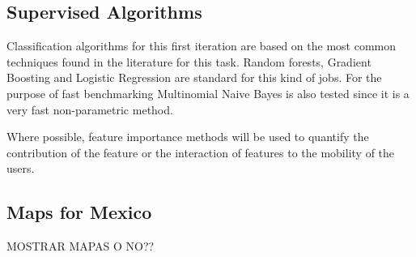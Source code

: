 \subsection{Supervised Algorithms}

Classification algorithms for this first iteration are based on the most common techniques found in the literature for this task. Random forests, Gradient Boosting and Logistic Regression are standard for this kind of jobs. For the purpose of fast benchmarking Multinomial Naive Bayes is also tested since it is a very fast non-parametric method. 

Where possible, feature importance methods will be used to quantify the contribution of the feature or the interaction of features to the mobility of the users.  

\subsection{Maps for Mexico}
MOSTRAR MAPAS O NO??